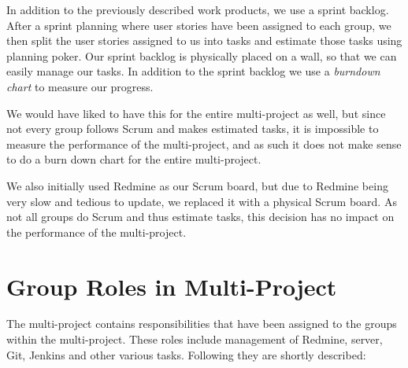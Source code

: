 In addition to the previously described work products, we use a sprint backlog. After a sprint planning where user stories have been assigned to each group, we then split the user stories assigned to us into tasks and estimate those tasks using planning poker. Our sprint backlog is physically placed on a wall, so that we can easily manage our tasks. In addition to the sprint backlog we use a \emph{burndown chart} to measure our progress.

We would have liked to have this for the entire multi-project as well, but since not every group follows Scrum and makes estimated tasks, it is impossible to measure the performance of the multi-project, and as such it does not make sense to do a burn down chart for the entire multi-project. 

We also initially used Redmine as our Scrum board, but due to Redmine being very slow and tedious to update, we replaced it with a physical Scrum board. As not all groups do Scrum and thus estimate tasks, this decision has no impact on the performance of the multi-project. 

\section{Group Roles in Multi-Project}\label{sec:multi_project_group_roles}

The multi-project contains responsibilities that have been assigned to the groups within the multi-project. These roles include management of Redmine, server, Git, Jenkins and other various tasks. Following they are shortly described:

